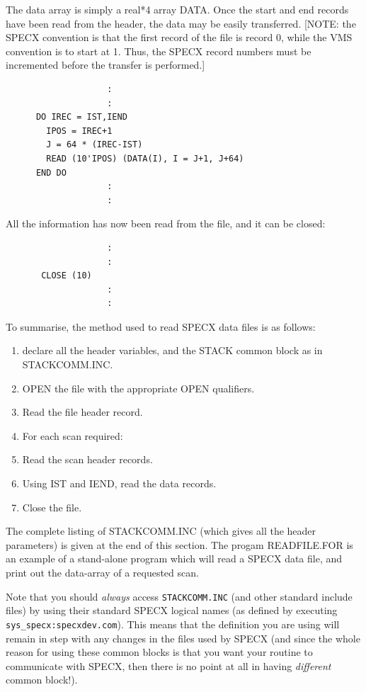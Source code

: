 \documentclass[11pt,twoside]{report}
\begin{document}
The data array is simply a real*4 array DATA. Once the start and end
records have been read from the header, the data may be easily
transferred. [NOTE: the SPECX convention is that the first record of
the file is record 0, while the VMS convention is to start at 1. Thus,
the SPECX record numbers must be incremented before the transfer is
performed.] 
                       
\begin{verbatim}
                    :
                    :
      DO IREC = IST,IEND	  
        IPOS = IREC+1                
        J = 64 * (IREC-IST)
        READ (10'IPOS) (DATA(I), I = J+1, J+64)
      END DO
                    :
                    :
\end{verbatim}

All the information has now been read from the file, and it can be
closed: 

\begin{verbatim}
                    :
                    :
       CLOSE (10)
                    :
                    :
\end{verbatim}
       
To summarise, the method used to read SPECX data files is as follows:
\begin{enumerate}
\item declare all the header variables, and the STACK common
       block as in STACKCOMM.INC.
\item OPEN the file with the appropriate OPEN qualifiers.
\item Read the file header record.
\item For each scan required:
\item Read the scan header records.
\item Using IST and IEND, read the data records.
\item Close the file.
\end{enumerate}
 

The complete listing of STACKCOMM.INC (which gives all the header
parameters) is given at the end of this section. The progam READFILE.FOR is an
example of a stand-alone program which will read a SPECX data file,
and print out the data-array of a requested scan. 

Note that you should {\em always} access \verb+STACKCOMM.INC+ (and other
standard include files) by using their standard SPECX logical names (as
defined by executing \verb+sys_specx:specxdev.com+). This means that the
definition you are using will remain in step with any changes in the files
used by SPECX (and since the whole reason for using these common blocks 
is that you want your routine to communicate with SPECX, then there is no
point at all in having {\em different} common block!).
\end{document}
